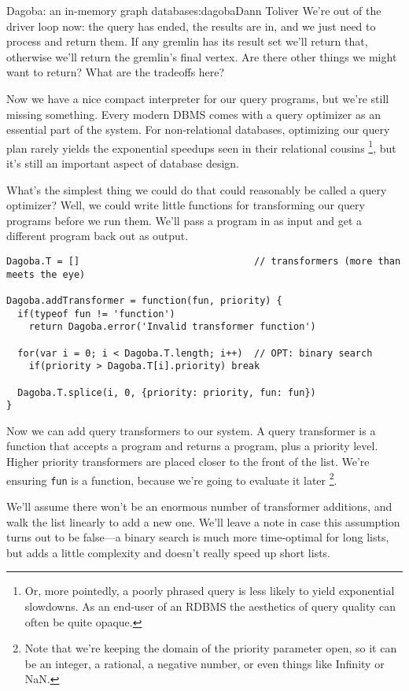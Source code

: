 \begin{aosachapter}{Dagoba: an in-memory graph database}{s:dagoba}{Dann Toliver}
We're out of the driver loop now: the query has ended, the results are
in, and we just need to process and return them. If any gremlin has its
result set we'll return that, otherwise we'll return the gremlin's final
vertex. Are there other things we might want to return? What are the
tradeoffs here?

\label{query-transformers}

Now we have a nice compact interpreter for our query programs, but we're
still missing something. Every modern DBMS comes with a query optimizer
as an essential part of the system. For non-relational databases,
optimizing our query plan rarely yields the exponential speedups seen in
their relational cousins \footnote{Or, more pointedly, a poorly phrased
  query is less likely to yield exponential slowdowns. As an end-user of
  an RDBMS the aesthetics of query quality can often be quite opaque.},
but it's still an important aspect of database design.

What's the simplest thing we could do that could reasonably be called a
query optimizer? Well, we could write little functions for transforming
our query programs before we run them. We'll pass a program in as input
and get a different program back out as output.

\begin{verbatim}
Dagoba.T = []                               // transformers (more than meets the eye)

Dagoba.addTransformer = function(fun, priority) {
  if(typeof fun != 'function')
    return Dagoba.error('Invalid transformer function')

  for(var i = 0; i < Dagoba.T.length; i++)  // OPT: binary search
    if(priority > Dagoba.T[i].priority) break

  Dagoba.T.splice(i, 0, {priority: priority, fun: fun})
}
\end{verbatim}

Now we can add query transformers to our system. A query transformer is
a function that accepts a program and returns a program, plus a priority
level. Higher priority transformers are placed closer to the front of
the list. We're ensuring \texttt{fun} is a function, because we're going
to evaluate it later \footnote{Note that we're keeping the domain of the
  priority parameter open, so it can be an integer, a rational, a
  negative number, or even things like Infinity or NaN.}.

We'll assume there won't be an enormous number of transformer additions,
and walk the list linearly to add a new one. We'll leave a note in case
this assumption turns out to be false---a binary search is much more
time-optimal for long lists, but adds a little complexity and doesn't
really speed up short lists.


\end{aosachapter}
